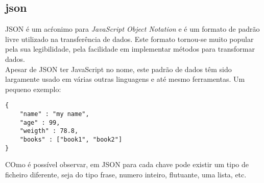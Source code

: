 \subsection{json}
JSON é um acŕonimo para \textit{JavaScript Object Notation} e é um formato de padrão livre utilizado na transferência de dados. Este formato tornou-se muito popular pela sua legibilidade, pela facilidade em implementar métodos para transformar dados.\newline \\
Apesar de JSON ter JavaScript no nome, este padrão de dados têm sido largamente usado em várias outras linguagens e até mesmo ferramentas.\newline
Um pequeno exemplo:
\begin{lstlisting}[style=json]
{
    "name" : "my name",
    "age" : 99,
    "weigth" : 78.8,
    "books" : ["book1", "book2"]
}
\end{lstlisting}
COmo é possível observar, em JSON para cada chave pode existir um tipo de ficheiro diferente, seja do tipo frase, numero inteiro, flutuante, uma lista, etc.
